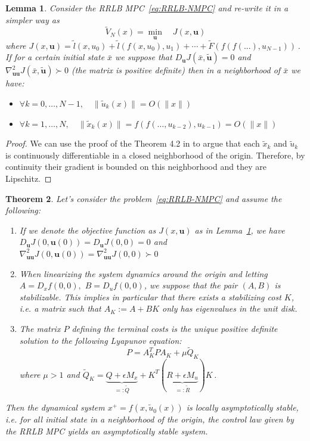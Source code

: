 \documentclass[conference]{IEEEtran}
\newtheorem{theorem}{Theorem}[section]
\newtheorem{lemma}[theorem]{Lemma}
\theoremstyle{definition}
\theoremstyle{remark}
\def\bf#1{\mathbf{#1}}
\begin{document}
\begin{lemma}\label{thm:Lipschitzianity}
	Consider the RRLB MPC~\ref{eq:RRLB-NMPC} and re-write it in a simpler way as
	$$\tilde{V}_N(x)=\underset{\bf{u}}{\min} \quad J(x,\bf{u})$$
	where $J(x,\bf{u})=\tilde{l}(x,u_0)+\tilde{l}(f(x,u_0),u_1)+\cdots+\tilde{F}(f(f(...),u_{N-1}))$\,.
	If for a certain initial state $\bar{x}$ we suppose that $D_\bf{u}J(\bar{x},\tilde{\bf{u}})=0$ and $\nabla_{\bf{u}\bf{u}}^2J(\bar{x}, \tilde{\bf{u}})\succ 0$ (the matrix is positive definite) then in a neighborhood of $\bar{x}$ we have:
	\begin{itemize}[label=\textbullet]
		\item $\forall k=0,\ldots,N-1,\quad \|\tilde{u}_k(x)\|=O(\|x\|)$
		\item $\forall k=1,\ldots,N,\quad \|\tilde{x}_k(x)\|=f(f(\ldots,u_{k-2}),u_{k-1})=O(\|x\|)$
	\end{itemize}
\end{lemma}
\begin{proof}
	We can use the proof of the Theorem 4.2 in \cite{lectures-parametric-optimization} to argue that each $\tilde{x}_k$ and $\tilde{u}_k$ is continuously differentiable in a closed neighborhood of the origin.
	Therefore, by continuity their gradient is bounded on this neighborhood and they are Lipschitz.
\end{proof}

\begin{theorem}\label{thm:nominal-stability}
	Let's consider the problem~\ref{eq:RRLB-NMPC} and assume the following:
	\begin{enumerate}
		\item If we denote the objective function as $J(x,\bf{u})$ as in Lemma~\ref{thm:Lipschitzianity}, we have $D_\bf{u}J(0,\bf{u}(0))=D_\bf{u}J(0,0)=0$ and $\nabla^2_{\bf{u}\bf{u}}J(0,\bf{u}(0))=\nabla^2_{\bf{u}\bf{u}}J(0,0)\succ 0$

		\item When linearizing the system dynamics around the origin and letting $A=D_xf(0,0),$ $B=D_uf(0,0)$, we suppose that the pair $(A,B)$ is stabilizable.
		This implies in particular that there exists a stabilizing cost $K$, i.e. a matrix such that $A_K:=A+BK$ only has eigenvalues in the unit disk.

		\item The matrix $P$ defining the terminal costs is the unique positive definite solution to the following Lyapunov equation:
		\begin{equation}
			\label{eq:Lyapunov}
			P=A_K^TPA_K+\mu \tilde{Q}_K
		\end{equation}
		where $\mu>1$ and $\tilde{Q}_K=\underbrace{Q+\epsilon M_x}_{=:\tilde{Q}}+K^T(\underbrace{R+\epsilon M_u}_{=:\tilde{R}})K$\,.
	\end{enumerate}
	Then the dynamical system $x^+=f(x,\tilde{u}_0(x))$ is locally asymptotically stable, i.e. for all initial state in a neighborhood of the origin, the control law given by the RRLB MPC yields an asymptotically stable system.
\end{theorem}
\end{document}
